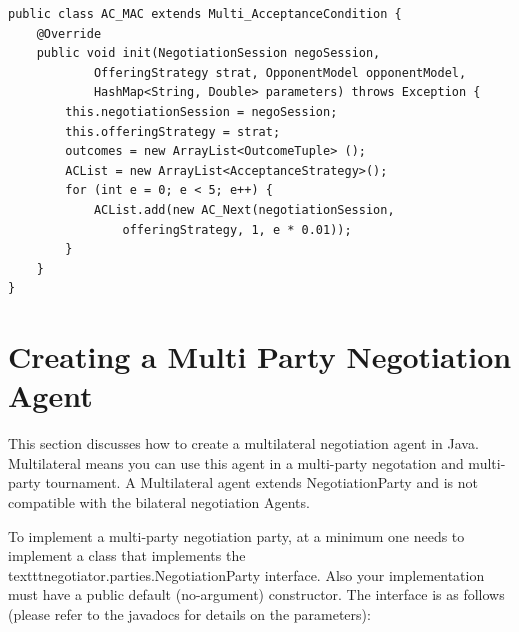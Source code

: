 \documentclass[]{article}
\begin{document}
\begin{lstlisting}
public class AC_MAC extends Multi_AcceptanceCondition {
	@Override
	public void init(NegotiationSession negoSession, 
			OfferingStrategy strat, OpponentModel opponentModel, 
			HashMap<String, Double> parameters) throws Exception {
		this.negotiationSession = negoSession;
		this.offeringStrategy = strat;
		outcomes = new ArrayList<OutcomeTuple> ();
		ACList = new ArrayList<AcceptanceStrategy>();
		for (int e = 0; e < 5; e++) {
			ACList.add(new AC_Next(negotiationSession, 
				offeringStrategy, 1, e * 0.01));
		}
	}
}

\end{lstlisting}





\section{Creating a Multi Party Negotiation Agent}
This section discusses how to create a multilateral negotiation agent in Java. Multilateral means you can use this agent in a multi-party negotation and multi-party tournament. A Multilateral agent extends NegotiationParty and is not compatible with the bilateral negotiation Agents.

To implement a multi-party negotiation party, at a minimum one needs to implement a class that implements the \\texttt{negotiator.parties.NegotiationParty} interface. Also your implementation must have a public default (no-argument) constructor. The interface is as follows (please refer to the javadocs for details on the parameters): 
\end{document}
